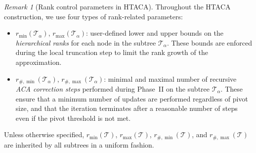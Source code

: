 \documentclass{article}
\theoremstyle{plain}
\theoremstyle{definition}
\theoremstyle{remark}
\newtheorem{remark}[theorem]{Remark}
\begin{document}
\begin{remark}[Rank control parameters in HTACA]
Throughout the HTACA construction, we use four types of rank-related parameters:
\begin{itemize}
  \item \( r_{\min}(\mathcal{T}_\alpha) \), \( r_{\max}(\mathcal{T}_\alpha) \): user-defined lower and upper bounds on the \emph{hierarchical ranks} for each node in the subtree \(\mathcal{T}_\alpha\). These bounds are enforced during the local truncation step to limit the rank growth of the approximation.
  
  \item \( r_{\#,\min}(\mathcal{T}_\alpha) \), \( r_{\#,\max}(\mathcal{T}_\alpha) \): minimal and maximal number of recursive \emph{ACA correction steps} performed during Phase~II on the subtree \(\mathcal{T}_\alpha\). These ensure that a minimum number of updates are performed regardless of pivot size, and that the iteration terminates after a reasonable number of steps even if the pivot threshold is not met.
\end{itemize}
Unless otherwise specified, \( r_{\min}(\mathcal{T}) \), \( r_{\max}(\mathcal{T}) \), \( r_{\#,\min}(\mathcal{T}) \), and \( r_{\#,\max}(\mathcal{T}) \) are inherited by all subtrees in a uniform fashion.
\end{remark}
\end{document}
